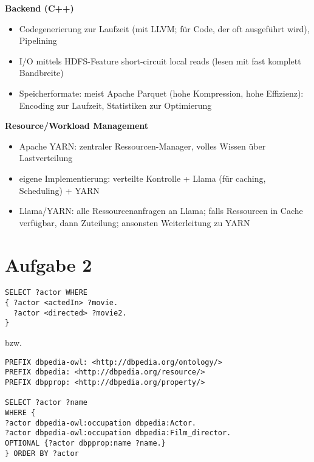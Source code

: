 \documentclass[a4paper]{scrartcl}
\begin{document}
\textbf{Backend (C++)}
\begin{itemize}
\item Codegenerierung zur Laufzeit (mit LLVM; für Code, der oft ausgeführt wird), Pipelining
\item I/O mittels HDFS-Feature short-circuit local reads (lesen mit fast komplett Bandbreite)
\item Speicherformate: meist Apache Parquet (hohe Kompression, hohe Effizienz): Encoding zur Laufzeit, Statistiken zur Optimierung
\end{itemize}

\textbf{Resource/Workload Management}
\begin{itemize}
\item Apache YARN: zentraler Ressourcen-Manager, volles Wissen über Lastverteilung
\item eigene Implementierung: verteilte Kontrolle + Llama (für caching, Scheduling) + YARN
\item Llama/YARN: alle Ressourcenanfragen an Llama; falls Ressourcen in Cache verfügbar, dann Zuteilung; ansonsten Weiterleitung zu YARN
\end{itemize}


\section*{Aufgabe 2}
\begin{verbatim}
SELECT ?actor WHERE
{ ?actor <actedIn> ?movie.
  ?actor <directed> ?movie2.
}
\end{verbatim}
bzw.
\begin{verbatim}
PREFIX dbpedia-owl: <http://dbpedia.org/ontology/>
PREFIX dbpedia: <http://dbpedia.org/resource/>
PREFIX dbpprop: <http://dbpedia.org/property/>

SELECT ?actor ?name
WHERE {
?actor dbpedia-owl:occupation dbpedia:Actor.
?actor dbpedia-owl:occupation dbpedia:Film_director.
OPTIONAL {?actor dbpprop:name ?name.}
} ORDER BY ?actor
\end{verbatim}
\end{document}
